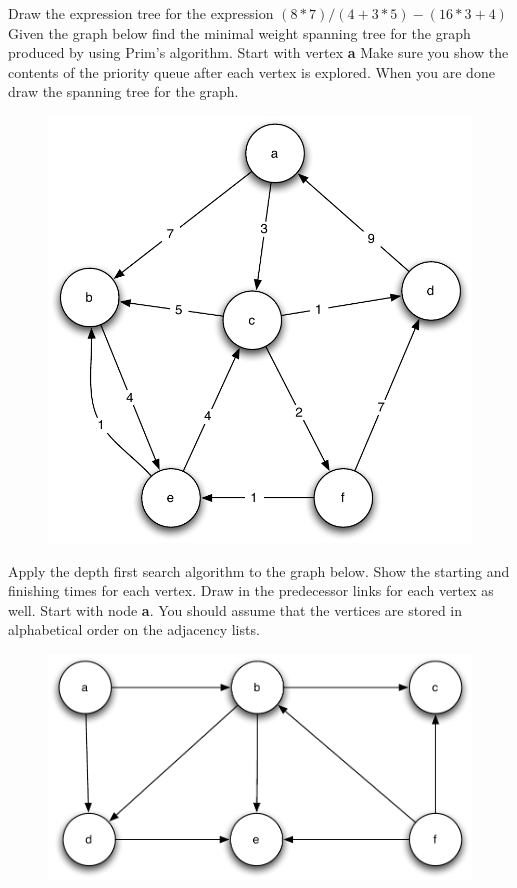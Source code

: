 \documentclass[11pt]{exam}
\begin{document}
\begin{questions}
\question[10] Draw the expression tree for the expression $(8 * 7) / (4 + 3 * 5) - (16 * 3 + 4)$  
\newpage
\question[10] Given the graph below find the minimal weight spanning tree for the graph produced by using Prim's algorithm. Start with vertex \textbf{a} Make sure you show the contents of the priority queue after each vertex is explored.  When you are done draw the spanning tree for the graph.
\begin{figure}[h!t]
        \begin{center}
        \includegraphics[scale=.75]{spanning}
    \end{center}
\end{figure}

\newpage
\question[10] Apply the depth first search algorithm to the graph below. Show the starting and finishing times for each vertex.  Draw in the  predecessor links for each vertex as well.  Start with node \textbf{a}.  You should assume that the vertices are stored in alphabetical order on the adjacency lists.
\begin{figure}[h!t]
        \begin{center}
        \includegraphics[scale=.75]{dfs}
    \end{center}
\end{figure}

\end{questions}
\end{document}

